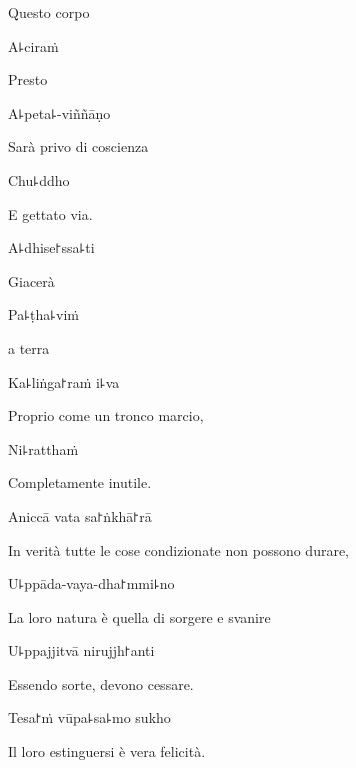 \begin{english}
Questo corpo
\end{english}

A꜕ciraṁ

\begin{english}
Presto
\end{english}

A꜕peta꜕-viññāṇo

\begin{english}
Sarà privo di coscienza
\end{english}

Chu꜕ddho

\begin{english}
E gettato via.
\end{english}

A꜕dhise꜓ssa꜕ti

\begin{english}
Giacerà
\end{english}

Pa꜕ṭha꜕viṁ

\begin{english}
a terra
\end{english}

Ka꜕liṅga꜓raṁ i꜕va

\begin{english}
Proprio come un tronco marcio,
\end{english}

Ni꜕ratthaṁ

\begin{english}
Completamente inutile.
\end{english}

Aniccā vata sa꜓ṅkhā꜓rā

\begin{english}
In verità tutte le cose condizionate non possono durare,
\end{english}

U꜕ppāda-vaya-dha꜓mmi꜕no

\begin{english}
La loro natura è quella di sorgere e svanire
\end{english}

U꜕ppajjitvā nirujjh꜓anti

\begin{english}
Essendo sorte, devono cessare.
\end{english}

Tesa꜓ṁ vūpa꜕sa꜕mo sukho

\begin{english}
Il loro estinguersi è vera felicità.
\end{english}

